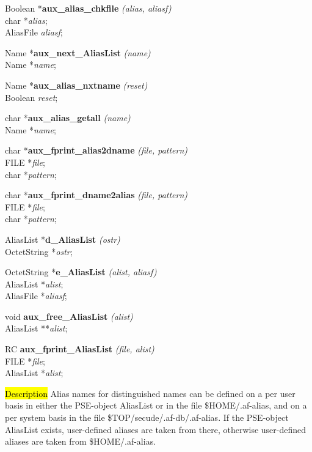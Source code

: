 Boolean *{\bf aux\_alias\_chkfile} {\em (alias, aliasf)} \\
char *{\em alias}; \\
AliasFile {\em aliasf};

Name *{\bf aux\_next\_AliasList} {\em (name)} \\
Name *{\em name};

Name *{\bf aux\_alias\_nxtname} {\em (reset)} \\
Boolean {\em reset};

char *{\bf aux\_alias\_getall} {\em (name)} \\
Name *{\em name};

char *{\bf aux\_fprint\_alias2dname} {\em (file, pattern)} \\
FILE *{\em file}; \\
char *{\em pattern}; 

char *{\bf aux\_fprint\_dname2alias} {\em (file, pattern)} \\
FILE *{\em file}; \\
char *{\em pattern};

AliasList *{\bf d\_AliasList} {\em (ostr)} \\
OctetString *{\em ostr};

OctetString *{\bf e\_AliasList} {\em (alist, aliasf)} \\
AliasList *{\em alist}; \\
AliasFile *{\em aliasf};

void {\bf aux\_free\_AliasList} {\em (alist)} \\
AliasList **{\em alist};

RC {\bf aux\_fprint\_AliasList} {\em (file, alist)} \\
FILE *{\em file}; \\
AliasList *{\em alist};

\hl{Description}
Alias names for distinguished names can be defined on a per user basis in either the PSE-object
AliasList or in the file \$HOME/.af-alias, and on a per system basis in the file
\$TOP/secude/.af-db/.af-alias. If the PSE-object AliasList exists, user-defined aliases
are taken from there, otherwise user-defined aliases are taken from \$HOME/.af-alias.

